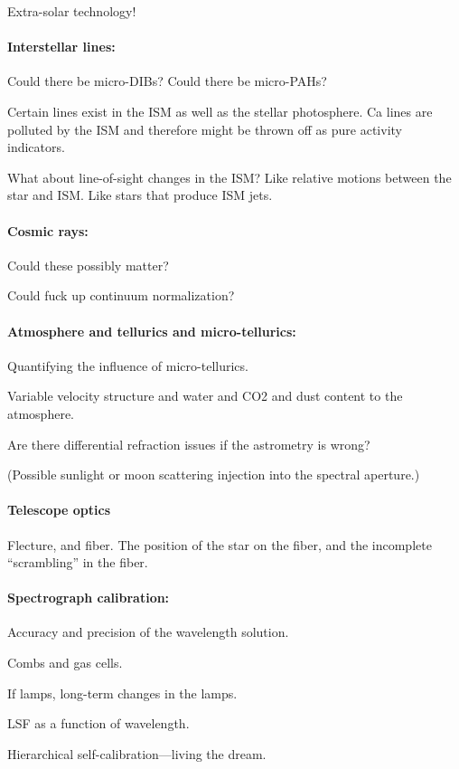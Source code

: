 \documentclass[12pt, fullpage, letterpaper]{article}
\begin{document}
Extra-solar technology!

\paragraph{Interstellar lines:}
Could there be micro-DIBs? Could there be micro-PAHs?

Certain lines exist in the ISM as well as the stellar photosphere. Ca
lines are polluted by the ISM and therefore might be thrown off as
pure activity indicators.

What about line-of-sight changes in the ISM? Like relative motions
between the star and ISM. Like stars that produce ISM jets.

\paragraph{Cosmic rays:}
Could these possibly matter?

Could fuck up continuum normalization?

\paragraph{Atmosphere and tellurics and micro-tellurics:}
Quantifying the influence of micro-tellurics.

Variable velocity structure and water and CO2 and dust content to the atmosphere.

Are there differential refraction issues if the astrometry is wrong?

(Possible sunlight or moon scattering injection into the spectral aperture.)

\paragraph{Telescope optics}
Flecture, and fiber. The position of the star on the fiber, and the
incomplete ``scrambling'' in the fiber.

\paragraph{Spectrograph calibration:}
Accuracy and precision of the wavelength solution.

Combs and gas cells.

If lamps, long-term changes in the lamps.

LSF as a function of wavelength.

Hierarchical self-calibration---living the dream.
\end{document}
